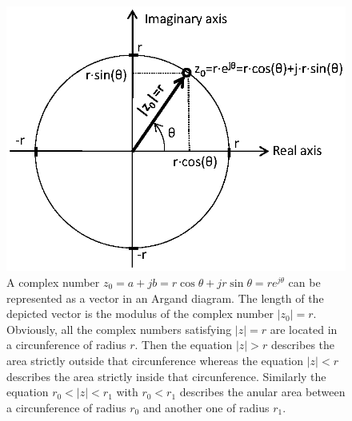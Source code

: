 \documentclass[a4paper,11pt,oneside]{article}
\begin{document}
\begin{itemize}
\begin{figure}
\centering
\includegraphics[width=.7\textwidth]{arganddiagram.eps}
\caption{A complex number $z_0=a+jb=r\cos \theta + jr\sin \theta=re^{j\theta}$ can be represented as a vector in an Argand diagram. The length of the depicted vector is the modulus of the complex number $|z_0|=r$. Obviously, all the complex numbers satisfying $|z|=r$ are located in a circunference of radius $r$. Then the equation $|z|>r$ describes the area strictly outside that circunference whereas the equation $|z|<r$ describes the area strictly inside that circunference. Similarly the equation $r_0<|z|<r_1$ with $r_0<r_1$ describes the anular area between a circunference of radius $r_0$ and another one of radius $r_1$.}
\label{arganddiagram}
\end{figure}


 

\end{itemize}
\end{document}
